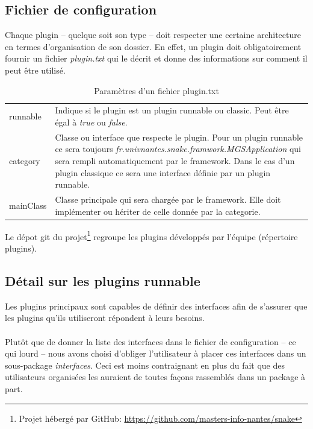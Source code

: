 \documentclass[12pt,a4paper]{article}
\begin{document}
\subsection{Fichier de configuration}
Chaque plugin -- quelque soit son type -- doit respecter une certaine architecture 
en termes d'organisation de son dossier. En effet, un plugin doit obligatoirement 
fournir un fichier \emph{plugin.txt} qui le décrit et donne des informations sur 
comment il peut être utilisé.

\begin{table}[!h]\label{tab:plugintxt}
\centering
	\begin{tabular}{lp{10cm}}
		runnable & Indique si le plugin est un plugin runnable ou classic. 
		Peut être égal à \emph{true} ou \emph{false}.\\				
		
		category & Classe ou interface que respecte le plugin. Pour un plugin 
		runnable ce sera toujours \emph{fr.univnantes.snake.framwork.MGSApplication} 
		qui sera rempli automatiquement par le framework. Dans le cas d'un plugin 
		classique ce sera une interface définie par un plugin runnable.\\
		
		mainClass & Classe principale qui sera chargée par le framework. 
		Elle doit implémenter ou hériter de celle donnée par la categorie.\\
	\end{tabular}	
\caption{Paramètres d'un fichier plugin.txt}
\end{table}

Le dépot git du projet\footnote{Projet hébergé par GitHub: 
\href{github.com/masters-info-nantes/snake}
{https://github.com/masters-info-nantes/snake}} regroupe les plugins développés 
par l'équipe (répertoire plugins).

\subsection{Détail sur les plugins runnable}\label{sss:DetailsRunnable}
Les plugins principaux sont capables de définir des interfaces afin de s'assurer 
que les plugins qu'ils utiliseront répondent à leurs besoins.
\\\\
Plutôt que de donner la liste des interfaces dans le fichier de configuration -- 
ce qui lourd -- nous avons choisi d'obliger l'utilisateur à placer ces interfaces 
dans un sous-package \emph{interfaces}. Ceci est moins contraignant en plus du 
fait que des utilisateurs organisées les auraient de toutes façons rassemblés 
dans un package à part.
\end{document}
